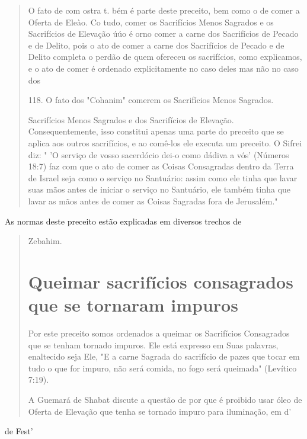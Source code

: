 \begin{quote}
O fato de com ostra t. bém é parte deste preceito, bem como o de comer a
Oferta de Eleào. Co tudo, comer os Sacrifícios Menos Sagrados e os
Sacrifícios de Elevação úúo é orno comer a carne dos Sacrifícios de
Peca­do e de Delito, pois o ato de comer a carne dos Sacrifícios de
Pecado e de Deli­to completa o perdão de quem ofereceu os sacrifícios,
como explicamos, e o ato de comer é ordenado explicitamente no caso
deles mas não no caso dos

118. O fato dos "Cohanim" comerem os Sacrifícios Menos Sagrados.

Sacrifícios Menos Sagrados e dos Sacrifícios de Elevação.
Consequentemente, isso constitui apenas uma parte do preceito que se
aplica aos outros sacrifícios, e ao comê-los ele executa um preceito. O
Sifrei diz: " 'O serviço de vosso sa­cerdócio dei-o como dádiva a vós'
(Números 18:7) faz com que o ato de comer as Coisas Consagradas dentro
da Terra de Israel seja como o serviço no Santuá­rio: assim como ele
tinha que lavar suas mãos antes de iniciar o serviço no San­tuário, ele
também tinha que lavar as mãos antes de comer as Coisas Sagradas fora de
Jerusalém."
\end{quote}

As normas deste preceito estão explicadas em diversos trechos de

\begin{quote}
Zebahim.

\section{Queimar sacrifícios consagrados que se tornaram impuros}

Por este preceito somos ordenados a queimar os Sacrifícios Consa­grados
que se tenham tornado impuros. Ele está expresso em Suas palavras,
enaltecido seja Ele, "E a carne Sagrada do sacrifício de pazes que tocar
em tudo o que for impuro, não será comida, no fogo será queimada"
(Levítico 7:19).

A Guemará de Shabat discute a questão de por que é proibido usar óleo de
Oferta de Elevação que tenha se tornado impuro para iluminação, em d'
\end{quote}

de Fest'

